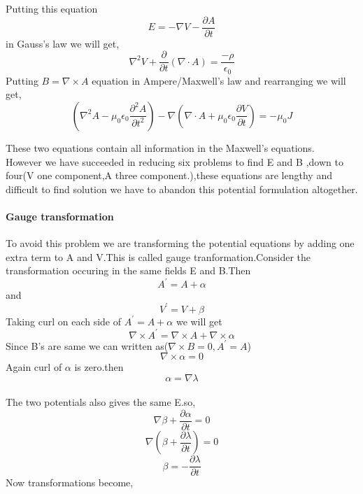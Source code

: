 Putting this equation $$E=-\nabla V-\frac{\partial A}{\partial t}$$  in Gauss's law
we will get,\\
$$\nabla ^2V+\frac{\partial }{\partial t}(\nabla \cdot A)=\frac{-\rho}{\epsilon_{0}}$$
Putting $B=\nabla\times A$  equation in Ampere/Maxwell's law and rearranging we will get,\\
$$\left( \nabla^2A-\mu_{0}\epsilon_{0}\frac{\partial^2 A}{\partial t^2}\right) -\nabla\left( \nabla \cdot A+\mu_{0}\epsilon_{0}\frac{\partial V}{\partial t}\right) =-\mu_{0} J$$ 

These two equations contain all information in the Maxwell's equations.\\
However we have succeeded in reducing six problems to find E and B ,down to four(V one component,A three component.),these equations are lengthy and difficult to find solution we have to abandon this potential formulation altogether.\\
\paragraph{Gauge transformation}
To avoid this problem we are transforming the potential equations by adding one extra term to A and V.This is called gauge tranformation.Consider the transformation occuring in the same fields E and B.Then\\
$$A^{\prime}=A+\alpha$$ and
$$V^{\prime}=V+\beta$$
Taking curl on each side of $A^{\prime}=A+\alpha$
we will get 
$$\nabla \times A^{\prime}=\nabla \times A+\nabla \times \alpha$$
Since B's are same we can written as($\nabla \times B=0,A^{\prime}=A$) \\
$$\nabla \times \alpha =0$$
Again curl of $\alpha$ is zero.then\\
$$\alpha=\nabla \lambda$$\\
The two potentials also gives the same E.so,\\
$$\nabla \beta +\frac{\partial \alpha }{\partial t}=0$$
$$\nabla\left( \beta+\frac{\partial \lambda}{\partial t}\right) =0$$
$$\beta= -\frac{\partial \lambda}{\partial t}$$
Now transformations become,\\

\begin{center}
\end{center}
